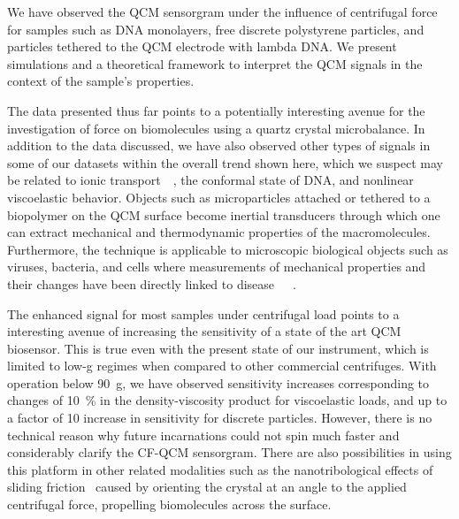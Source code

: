 We have observed the QCM sensorgram under the influence of centrifugal force
for samples such as DNA monolayers, free discrete polystyrene particles,
and particles tethered to the QCM electrode with lambda DNA.  We present
simulations and a theoretical framework to interpret the QCM signals in the
context of the sample's properties.

The data presented thus far points to a potentially interesting avenue for
the investigation of force on biomolecules using a quartz crystal
microbalance.  In addition to the data discussed, we have also observed
other types of signals in some of our datasets within the overall trend
shown here, which we suspect may be related to ionic
transport~\cite{tolman1911electromotive}~\cite{des1893unpolarisirbare}, the
conformal state of DNA, and nonlinear viscoelastic behavior.  Objects such
as microparticles attached or tethered to a biopolymer on the QCM surface
become inertial transducers through which one can extract mechanical and
thermodynamic properties of the macromolecules. Furthermore, the technique
is applicable to microscopic biological objects such as viruses, bacteria,
and cells where measurements of mechanical properties and their changes
have been directly linked to
disease~\cite{merkel1989molecular}~\cite{yeri2009mutation}~\cite{tevet2011friction}.

The enhanced signal for most samples under centrifugal load points to a
interesting avenue of increasing the sensitivity of a state of the art QCM
biosensor.  This is true even with the present state of our instrument,
which is limited to low-g regimes when compared to other commercial
centrifuges. With operation below \SI{90}{g}, we have observed sensitivity
increases corresponding to changes of \SI{10}{\percent} in the
density-viscosity product for viscoelastic loads, and up to a factor of 10
increase in sensitivity for discrete particles.  However, there is no
technical reason why future incarnations could not spin much faster and
considerably clarify the CF-QCM sensorgram.  There are also possibilities in
using this platform in other related modalities such as the
nanotribological effects of sliding friction~\cite{krim1991nanotribology}
caused by orienting the crystal at an angle to the applied centrifugal
force, propelling biomolecules across the surface.

